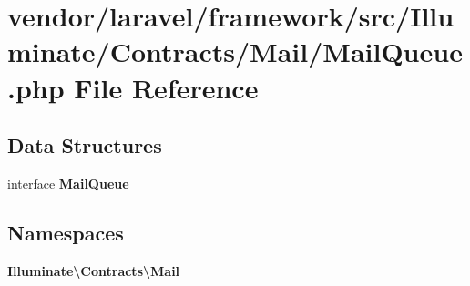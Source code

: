 \section{vendor/laravel/framework/src/\+Illuminate/\+Contracts/\+Mail/\+Mail\+Queue.php File Reference}
\label{_mail_queue_8php}
\subsection*{Data Structures}
\begin{DoxyCompactItemize}
\item 
interface {\bf Mail\+Queue}
\end{DoxyCompactItemize}
\subsection*{Namespaces}
\begin{DoxyCompactItemize}
\item 
 {\bf Illuminate\textbackslash{}\+Contracts\textbackslash{}\+Mail}
\end{DoxyCompactItemize}
